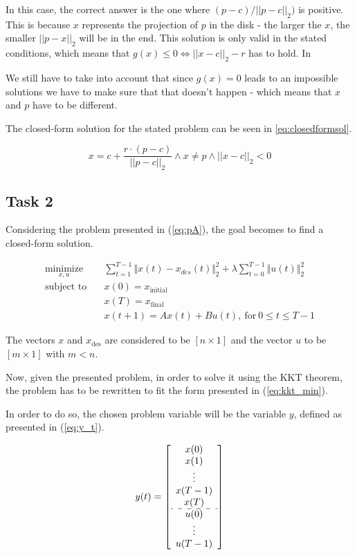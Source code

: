 In this case, the correct answer is the one where $(p - c)/||p-c||_2)$ is positive. This is because $x$ represents the projection of $p$ in the disk - the larger the $x$, the smaller $||p - x||_2$ will be in the end. This solution is only valid in the stated conditions, which means that $g(x) \leq 0 \Leftrightarrow ||x - c||_2 - r$ has to hold. In 

We still have to take into account that since $g(x) = 0$ leads to an impossible solutions we have to make sure that that doesn't happen - which means that $x$ and $p$ have to be different.

The closed-form solution for the stated problem can be seen in \eqref{eq:closedformsol}.

\begin{equation}
\label{eq:closedformsol}
    x = c + \frac{r \cdot (p - c)}{||p - c||_2} \wedge x \neq p \wedge ||x - c||_2 < 0
\end{equation}

\subsection{Task 2}
Considering the problem presented in (\ref{eq:pA}), the goal becomes to find a closed-form solution.

\begin{equation}
\label{eq:pA}
\begin{aligned}
\underset{x,u}{\text{minimize}} \quad & \sum_{t = 1}^{T-1} \Vert  x(t) - x_{des}(t)  \Vert_2^2   + \lambda \sum_{t = 0}^{T-1} \Vert  u(t)  \Vert_2^2 \\ 
\text{subject to} \quad & x(0) = x_{\text{initial}} \\
                  & x(T) = x_{\text{final}} \\
                  & x(t+1) = Ax(t) + Bu(t), \ \text{for} \  0 \leq t  \leq T - 1 
\end{aligned}
\end{equation}

The vectors $x$ and $x_{\text{des}}$ are considered to be $[n\times 1]$ and the vector $u$ to be $[m \times 1]$ with $m<n$.

Now, given the presented problem, in order to solve it using the KKT theorem, the problem has to be rewritten to fit the form presented in (\ref{eq:kkt_min}).

In order to do so, the chosen problem variable will be the variable $y$, defined as presented in (\ref{eq:y_t}).

\begin{equation}
\label{eq:y_t}
    y(t) = 
    \left[
    \begin{array}{c}
    x(0) \\
    x(1) \\
    \vdots \\
    x(T-1) \\
    x(T) \\ \hdashline
    u(0) \\
    \vdots \\
    u(T-1)
    \end{array}
    \right]
\end{equation}

